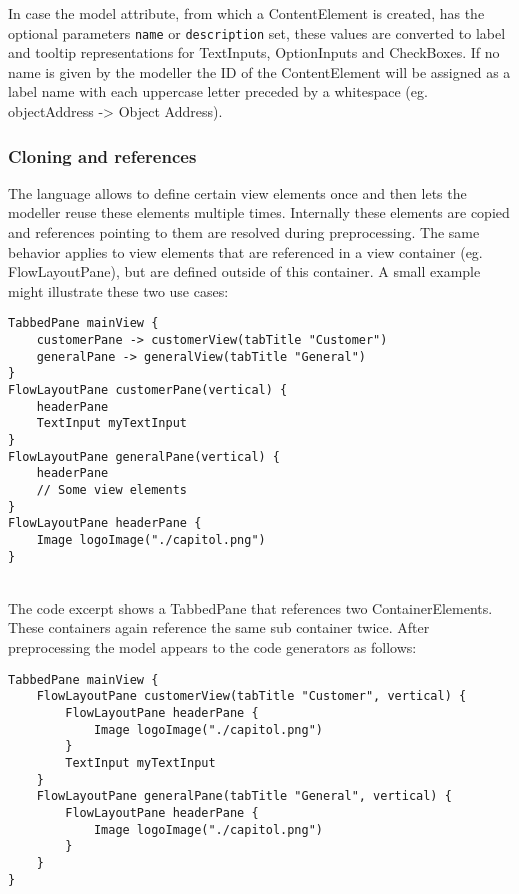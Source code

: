 In case the model attribute, from which a ContentElement is created, has the optional parameters \lstinline!name! or \lstinline!description! set, these values are converted to label and tooltip representations for TextInputs, OptionInputs and CheckBoxes. If no name is given by the modeller the ID of the ContentElement will be assigned as a label name with each uppercase letter preceded by a whitespace (eg. objectAddress -> Object Address).

\subsubsection{Cloning and references}
The \MD language allows to define certain view elements once and then lets the modeller reuse these elements multiple times. Internally these elements are copied and references pointing to them are resolved during preprocessing. The same behavior applies to view elements that are referenced in a view container (eg. FlowLayoutPane), but are defined outside of this container. A small example might illustrate these two use cases:

\begin{lstlisting}[language=MD2]
TabbedPane mainView {
	customerPane -> customerView(tabTitle "Customer")
	generalPane -> generalView(tabTitle "General")
}
FlowLayoutPane customerPane(vertical) {
	headerPane
	TextInput myTextInput
}
FlowLayoutPane generalPane(vertical) {
	headerPane
	// Some view elements
}
FlowLayoutPane headerPane {
	Image logoImage("./capitol.png")
}
\end{lstlisting}
~
\\
The code excerpt shows a TabbedPane that references two ContainerElements. These containers again reference the same sub container twice. After preprocessing the model appears to the code generators as follows: 
\begin{lstlisting}[language=MD2]
TabbedPane mainView {
	FlowLayoutPane customerView(tabTitle "Customer", vertical) {
		FlowLayoutPane headerPane {
			Image logoImage("./capitol.png")
	    }
		TextInput myTextInput
	}
	FlowLayoutPane generalPane(tabTitle "General", vertical) {
		FlowLayoutPane headerPane {
			Image logoImage("./capitol.png")
		}
	}
}
\end{lstlisting}

